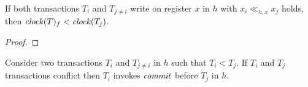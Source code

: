 \begin{proposition}
  If both transactions $T_i$ and $T_{j \neq i}$ write on register $x$ in $h$ with $x_i \ll_{h,x} x_j$ holds, then $\clockOf{T}_f < \clockOf{T_j}$.
\end{proposition}

\begin{proof}
  
\end{proof}

\begin{proposition}
  Consider two transactions $T_i$ and $T_{j \neq i}$ in $h$ such that $T_i < T_j$.
  If $T_i$ and $T_j$ transactions conflict then $T_i$ invokes $\stmCommitFunction$ before $T_j$ in $h$.
\end{proposition}

